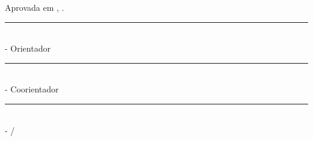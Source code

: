 \begin{folhadeaprovacao}
			\begin{flushleft}%
			    {Aprovada em {\imprimirmesapresentacao, \imprimiranoapresentacao}.}\\
						
				\vspace*{2 cm}%
				\rule{12 cm}{.1 mm}\\
				{\imprimirtitulacaoorientador}{ }{\imprimirorientador} - Orientador\\
				
				\vspace*{1 cm}%
				\rule{12 cm}{.1 mm}\\
				{\imprimirtitulacaocoorientador}{ }{\imprimircoorientador} - Coorientador\\
			
				\vspace*{1 cm}%
				\rule{12 cm}{.1 mm}\\
				\imprimirtitulacaoexamum\imprimirnmexamum{} - \imprimirinstexamum /\imprimirdepartamentoexamum
				
				\vspace*{1 cm}%
								
	
				\vspace*{1.3 cm}%
		    \end{flushleft}%


\end{folhadeaprovacao}
\makeatother
